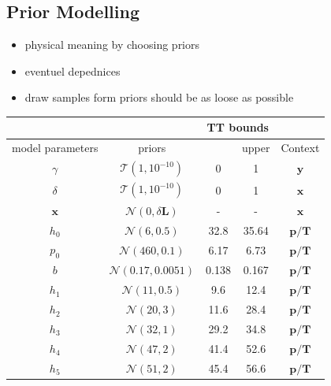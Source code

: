 \subsection{Prior Modelling}
\begin{itemize}
	\item physical meaning by choosing priors
	\item eventuel depednices
	\item draw samples form priors should be as loose as possible
\end{itemize}
\begin{table}
	\centering
	\begin{tabular}{ |c||c|c|c|c|   }
		\hline
		& &\multicolumn{2}{|c|}{TT bounds}&\\
		\hline
		model parameters& priors&\makecell{lower}& \makecell{upper\\
		}&Context\\
		\hline
		$\gamma$ & $\mathcal{T}(1,10^{-10})$ &0 &1& $\bm{y}$\\ \hhline{|=||=|=|=|=|}
		$\delta$ &$\mathcal{T}(1,10^{-10})$ & 0&1& $\bm{x}$\\ \hline
		$\bm{x}$ &$\mathcal{N}(0,\delta \bm{L})$ & -&-& $\bm{x}$\\ \hhline{|=||=|=|=|=|}
		$h_0$ &  $\mathcal{N}(6,0.5)$& 32.8&35.64&$\bm{p/T}$\\ \hline
		$p_0$ &  $\mathcal{N}(460,0.1)$&6.17 &6.73&$\bm{p/T}$\\ \hline
		$b$ &  $\mathcal{N}(0.17,0.0051)$& 0.138  &0.167&$\bm{p/T}$\\ \hline
		$h_{1}$ &  $\mathcal{N}(11,0.5)$&9.6 &12.4&$\bm{p/T}$\\ \hline
		$h_{2}$ &  $\mathcal{N}(20,3)$&11.6 &28.4&$\bm{p/T}$\\ \hline
		$h_{3}$ &  $\mathcal{N}(32,1)$&29.2 &34.8&$\bm{p/T}$\\ \hline
		$h_{4}$ &  $\mathcal{N}(47,2)$&41.4 &52.6&$\bm{p/T}$\\ \hline
		$h_{5}$ &  $\mathcal{N}(51,2)$&45.4 &56.6&$\bm{p/T}$\\ \hline

\end{tabular}
\end{table}

